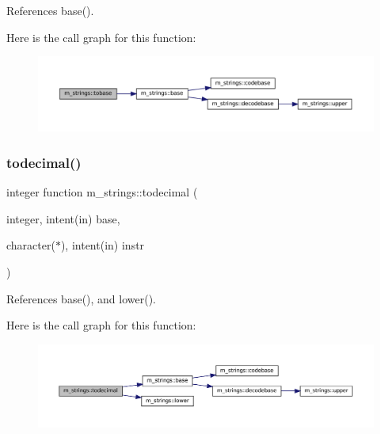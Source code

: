 References base().

Here is the call graph for this function\+:
\nopagebreak
\begin{figure}[H]
\begin{center}
\leavevmode
\includegraphics[width=350pt]{namespacem__strings_aa896d221112afb3dbc90eeca6075b282_cgraph}
\end{center}
\end{figure}
\mbox{\label{namespacem__strings_aded6e43ae13ff21d76c1739f01a40a63}} 
\subsubsection{\texorpdfstring{todecimal()}{todecimal()}}
{\footnotesize\ttfamily integer function m\+\_\+strings\+::todecimal (\begin{DoxyParamCaption}\item[{integer, intent(in)}]{base,  }\item[{character($\ast$), intent(in)}]{instr }\end{DoxyParamCaption})\hspace{0.3cm}{\ttfamily [private]}}



References base(), and lower().

Here is the call graph for this function\+:
\nopagebreak
\begin{figure}[H]
\begin{center}
\leavevmode
\includegraphics[width=350pt]{namespacem__strings_aded6e43ae13ff21d76c1739f01a40a63_cgraph}
\end{center}
\end{figure}
\mbox{\label{namespacem__strings_aaee428861205782e002f5e7e8fb002f0}} 

